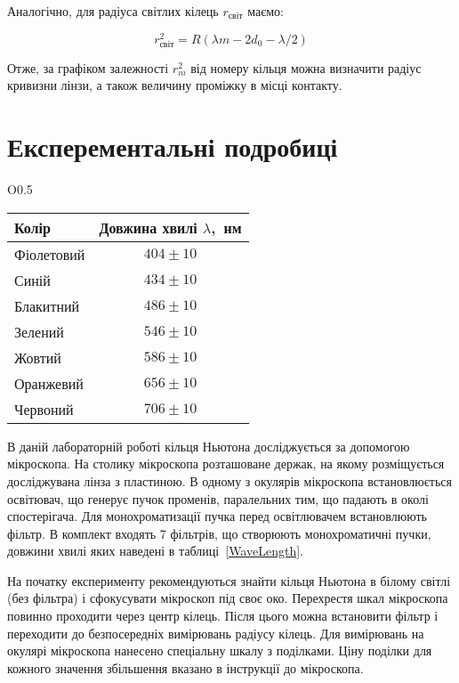 Аналогічно, для радіуса світлих кілець $r_\text{світ}$ маємо:

\begin{equation}
\label{rlight}
r_\text{світ}^2=R(\lambda m-2d_{0}-\lambda/2)
\end{equation}

Отже, за графіком залежності $r^2_m$ від номеру кільця можна визначити радіус кривизни лінзи, а також величину проміжку в місці контакту.

\section{Експерементальні подробиці}

\begin{wraptable}{O}{0.5\linewidth}
	\centering
	\begin{tabular}{lc}
		\toprule
		Колір                          & Довжина хвилі $\lambda$,~нм \\ \midrule
		\rowcolor{violet!10}Фіолетовий &             $ 404 \pm 10$             \\
		\rowcolor{blue!10}Синій        &             $ 434 \pm 10$             \\
		\rowcolor{cyan!10}Блакитний    &             $ 486 \pm 10 $             \\
		\rowcolor{green!10}Зелений     &             $ 546 \pm 10 $             \\
		\rowcolor{yellow!10}Жовтий     &             $ 586 \pm 10 $             \\
		\rowcolor{orange!10}Оранжевий  &             $ 656 \pm 10 $             \\
		\rowcolor{red!10}Червоний      &             $ 706 \pm 10 $             \\ \bottomrule
	\end{tabular}
	\caption{Довжини хвиль}
	\label{WaveLength}
\end{wraptable}
В даній лабораторній роботі кільця Ньютона досліджується за допомогою мікроскопа. На столику мікроскопа розташоване держак, на якому розміщується досліджувана лінза з пластиною. В одному з окулярів мікроскопа встановлюється освітювач, що генерує пучок променів, паралельних тим, що падають в околі спостерігача. Для монохроматизації пучка перед освітлювачем встановлюють фільтр. В комплект входять 7 фільтрів, що створюють  монохроматичні пучки, довжини хвилі яких наведені в таблиці~\ref{WaveLength}.

На початку експерименту рекомендуються знайти кільця Ньютона в білому світлі (без фільтра) і сфокусувати мікроскоп під своє око. Перехрестя шкал мікроскопа повинно проходити через центр кілець. Після цього можна встановити фільтр і переходити до безпосередніх вимірювань радіусу кілець. Для вимірювань  на окулярі мікроскопа нанесено спеціальну шкалу з поділками. Ціну поділки для кожного значення збільшення вказано в інструкції до мікроскопа.

